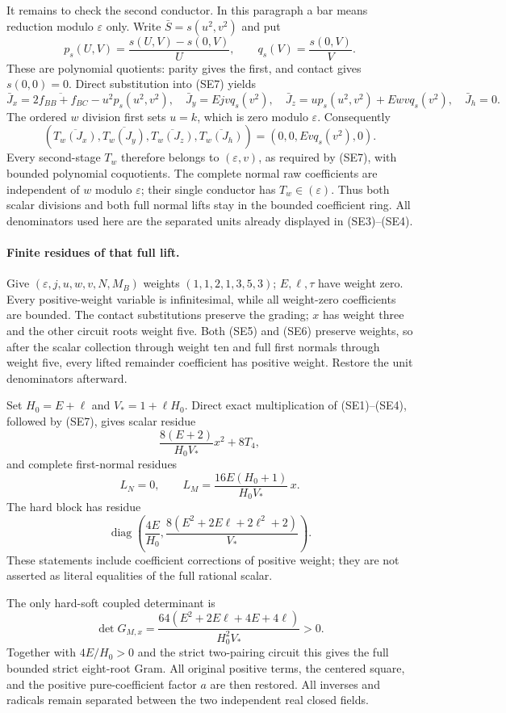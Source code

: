 It remains to check the second conductor. In this paragraph a bar
means reduction modulo $\varepsilon$ only. Write
$\bar S=s(u^2,v^2)$ and put
\[
 p_s(U,V)=\frac{s(U,V)-s(0,V)}{U},\qquad
 q_s(V)=\frac{s(0,V)}{V}.
\]
These are polynomial quotients: parity gives the first, and contact
gives $s(0,0)=0$. Direct substitution into (SE7) yields
\[
 \bar J_x=\overline{2f_{BB}+f_{BC}}-u^2p_s(u^2,v^2),\quad
 \bar J_y=Ejv q_s(v^2),\quad
 \bar J_z=u p_s(u^2,v^2)+Ewv q_s(v^2),\quad \bar J_h=0.
\]
The ordered $w$ division first sets $u=k$, which is zero modulo
$\varepsilon$. Consequently
\[
 (\overline{T_w(J_x)},\overline{T_w(J_y)},
   \overline{T_w(J_z)},\overline{T_w(J_h)})
       =(0,0,Ev q_s(v^2),0).
\]
Every second-stage $T_w$ therefore belongs to $(\varepsilon,v)$,
as required by (SE7), with bounded polynomial coquotients. The complete
normal raw coefficients are independent of $w$ modulo $\varepsilon$;
their single conductor has $T_w\in(\varepsilon)$. Thus both scalar
divisions and both full normal lifts stay in the bounded coefficient
ring. All denominators used here are the separated units already
displayed in (SE3)--(SE4).

\paragraph{Finite residues of that full lift.}
Give $(\varepsilon,j,u,w,v,N,M_B)$ weights $(1,1,2,1,3,5,3)$;
$E,\ell,\tau$ have weight zero. Every positive-weight variable is
infinitesimal, while all weight-zero coefficients are bounded.
The contact substitutions preserve the grading; $x$ has weight three
and the other circuit roots weight five. Both (SE5) and (SE6) preserve
weights, so after the scalar collection through weight ten and full
first normals through weight five, every lifted remainder coefficient
has positive weight. Restore the unit denominators afterward.

Set $H_0=E+\ell$ and $V_*=1+\ell H_0$. Direct exact multiplication of
(SE1)--(SE4), followed by (SE7), gives scalar residue
\[
       \frac{8(E+2)}{H_0V_*}x^2+8T_4,                         \tag{SE9}
\]
and complete first-normal residues
\[
       L_N=0,\qquad L_M=\frac{16E(H_0+1)}{H_0V_*}\,x.
\]
The hard block has residue
\[
 \operatorname{diag}\left(\frac{4E}{H_0},
           \frac{8(E^2+2E\ell+2\ell^2+2)}{V_*}\right).       \tag{SE10}
\]
These statements include coefficient corrections of positive weight;
they are not asserted as literal equalities of the full rational scalar.

The only hard-soft coupled determinant is
\[
 \det G_{M,x}
 =\frac{64(E^2+2E\ell+4E+4\ell)}{H_0^2V_*}>0.              \tag{SE11}
\]
Together with $4E/H_0>0$ and the strict two-pairing circuit this gives
the full bounded strict eight-root Gram. All original positive terms,
the centered square, and the positive pure-coefficient factor $a$ are
then restored. All inverses and radicals remain separated between the
two independent real closed fields.



